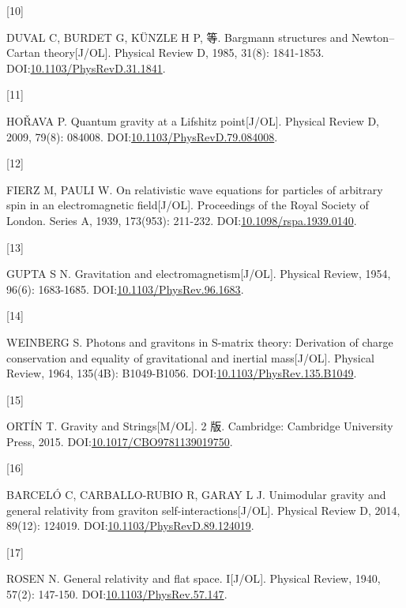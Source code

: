 \documentclass[
  chinese,
  a4paper,
  UTF8,
  12pt,
  oneside,
  openany]{ctexbook}
\newlength{\cslhangindent}
\newlength{\csllabelwidth}
\newenvironment{CSLReferences}[2] %
 {\begin{list}{}{%
  \setlength{\itemindent}{0pt}
  \setlength{\leftmargin}{0pt}
  \setlength{\parsep}{0pt}
  \ifodd #1
   \setlength{\leftmargin}{\cslhangindent}
   \setlength{\itemindent}{-1\cslhangindent}
  \fi
  \setlength{\itemsep}{#2\baselineskip}}}
 {\end{list}}
\newcommand{\CSLLeftMargin}[1]{\parbox[t]{\csllabelwidth}{\strut#1\strut}}
\newcommand{\CSLRightInline}[1]{\parbox[t]{\linewidth - \csllabelwidth}{\strut#1\strut}}
\theoremstyle{plain}
\theoremstyle{plain}
\theoremstyle{plain}
\theoremstyle{definition}
\theoremstyle{plain}
\theoremstyle{plain}
\theoremstyle{remark}
\begin{document}
\begin{CSLReferences}{0}{0}
\CSLLeftMargin{{[}10{]} }%
\CSLRightInline{DUVAL C, BURDET G, KÜNZLE H P, 等. Bargmann structures
and Newton--Cartan theory{[}J/OL{]}. Physical Review D, 1985, 31(8):
1841-1853.
DOI:\href{https://doi.org/10.1103/PhysRevD.31.1841}{10.1103/PhysRevD.31.1841}.}

\CSLLeftMargin{{[}11{]} }%
\CSLRightInline{HOŘAVA P. Quantum gravity at a Lifshitz point{[}J/OL{]}.
Physical Review D, 2009, 79(8): 084008.
DOI:\href{https://doi.org/10.1103/PhysRevD.79.084008}{10.1103/PhysRevD.79.084008}.}

\CSLLeftMargin{{[}12{]} }%
\CSLRightInline{FIERZ M, PAULI W. On relativistic wave equations for
particles of arbitrary spin in an electromagnetic field{[}J/OL{]}.
Proceedings of the Royal Society of London. Series A, 1939, 173(953):
211-232.
DOI:\href{https://doi.org/10.1098/rspa.1939.0140}{10.1098/rspa.1939.0140}.}

\CSLLeftMargin{{[}13{]} }%
\CSLRightInline{GUPTA S N. Gravitation and electromagnetism{[}J/OL{]}.
Physical Review, 1954, 96(6): 1683-1685.
DOI:\href{https://doi.org/10.1103/PhysRev.96.1683}{10.1103/PhysRev.96.1683}.}

\CSLLeftMargin{{[}14{]} }%
\CSLRightInline{WEINBERG S. Photons and gravitons in S-matrix theory:
Derivation of charge conservation and equality of gravitational and
inertial mass{[}J/OL{]}. Physical Review, 1964, 135(4B): B1049-B1056.
DOI:\href{https://doi.org/10.1103/PhysRev.135.B1049}{10.1103/PhysRev.135.B1049}.}

\CSLLeftMargin{{[}15{]} }%
\CSLRightInline{ORTÍN T. Gravity and Strings{[}M/OL{]}. 2 版. Cambridge:
Cambridge University Press, 2015.
DOI:\href{https://doi.org/10.1017/CBO9781139019750}{10.1017/CBO9781139019750}.}

\CSLLeftMargin{{[}16{]} }%
\CSLRightInline{BARCELÓ C, CARBALLO-RUBIO R, GARAY L J. Unimodular
gravity and general relativity from graviton
self-interactions{[}J/OL{]}. Physical Review D, 2014, 89(12): 124019.
DOI:\href{https://doi.org/10.1103/PhysRevD.89.124019}{10.1103/PhysRevD.89.124019}.}

\CSLLeftMargin{{[}17{]} }%
\CSLRightInline{ROSEN N. General relativity and flat space. I{[}J/OL{]}.
Physical Review, 1940, 57(2): 147-150.
DOI:\href{https://doi.org/10.1103/PhysRev.57.147}{10.1103/PhysRev.57.147}.}


\end{CSLReferences}
\end{document}
